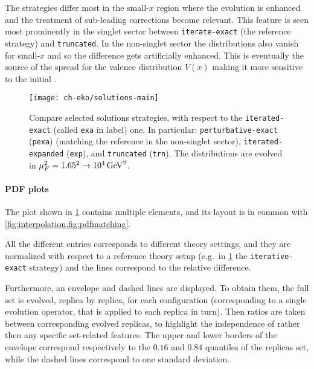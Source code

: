 The strategies differ most in the small-$x$ region where the \pdf{} evolution is
enhanced and the treatment of sub-leading corrections become relevant.
This feature is seen most prominently in the singlet sector between
\texttt{iterate-exact} (the reference strategy) and \texttt{truncated}.
In the non-singlet sector the distributions also vanish for small-$x$
and so the difference gets artificially enhanced.
This is eventually the source of the spread for the valence distribution $V(x)$
making it more sensitive to the initial \pdf{}.

\begin{figure}
    \centering
    \texttt{[image: ch-eko/solutions-main]}
    \caption{Compare selected solutions strategies, with respect to the
        \texttt{iterated-exact} (called \texttt{exa} in label) one. In
        particular: \texttt{perturbative-exact} (\texttt{pexa}) (matching
        the reference in the non-singlet sector),
        \texttt{iterated-expanded} (\texttt{exp}), and \texttt{truncated}
        (\texttt{trn}).
        The distributions are evolved in $\muF^2=\SI[parse-numbers=false]{1.65^2\to 10^4}{\GeV^2}$.}
    \label{fig:solutions}
\end{figure}

\paragraph{PDF plots} The \pdf{} plot shown in \cref{fig:solutions} contains
multiple elements, and its layout is in common with
\cref{fig:interpolation,fig:pdfmatching}.

All the different entries corresponds to different theory settings, and they
are normalized with respect to a reference theory setup
(e.g.\ in \cref{fig:solutions} the \texttt{iterative-exact} strategy)
and the lines correspond to the relative difference.

Furthermore, an envelope and dashed lines are displayed.
To obtain them, the full \pdf{} set is evolved, replica by replica, for each
configuration (corresponding to a single evolution operator, that is applied to
each replica in turn).
Then ratios are taken between corresponding evolved replicas, to highlight
the \pdf{} independence of \eko{} rather then any specific set-related features.
The upper and lower borders of the envelope correspond respectively
to the $0.16$ and $0.84$ quantiles of the replicas set,
while the dashed lines correspond to one standard deviation.
